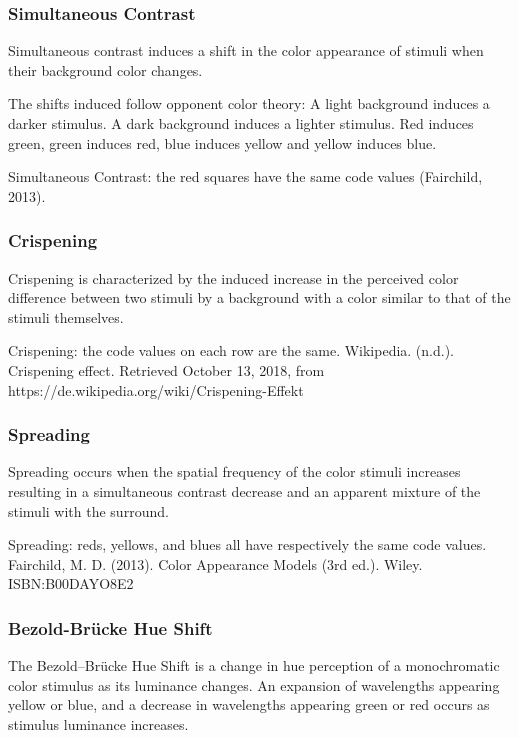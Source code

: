 \subsubsection{Simultaneous Contrast}
\label{subsubsec:simultaneous-contrast}
Simultaneous contrast induces a shift in the color appearance of stimuli when their background color changes.

The shifts induced follow opponent color theory:
A light background induces a darker stimulus.
A dark background induces a lighter stimulus.
Red induces green, green induces red, blue induces yellow and yellow induces blue.

Simultaneous Contrast: the red squares have the same code values (Fairchild, 2013).

\subsubsection{Crispening}
\label{subsubsec:crispening}

Crispening is characterized by the induced increase in the perceived color difference between two stimuli by a background with a color similar to that of the stimuli themselves.

Crispening: the code values on each row are the same.
Wikipedia. (n.d.). Crispening effect. Retrieved October 13, 2018, from https://de.wikipedia.org/wiki/Crispening-Effekt

\subsubsection{Spreading}
\label{subsubsec:spreading}

Spreading occurs when the spatial frequency of the color stimuli increases resulting in a simultaneous contrast decrease and an apparent mixture of the stimuli with the surround.

Spreading: reds, yellows, and blues all have respectively the same code values.
Fairchild, M. D. (2013). Color Appearance Models (3rd ed.). Wiley. ISBN:B00DAYO8E2

\subsubsection{Bezold-Brücke Hue Shift}
\label{subsubsec:bezold-brücke-hue-shift}

The Bezold–Brücke Hue Shift is a change in hue perception of a monochromatic color stimulus as its luminance changes. An expansion of wavelengths appearing yellow or blue, and a decrease in wavelengths appearing green or red occurs as stimulus luminance increases.

